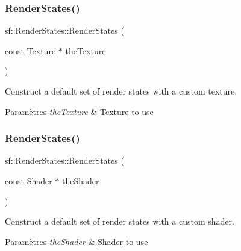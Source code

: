 \subsubsection{\texorpdfstring{Render\+States()}{RenderStates()}\hspace{0.1cm}{\footnotesize\ttfamily [4/6]}}
{\footnotesize\ttfamily sf\+::\+Render\+States\+::\+Render\+States (\begin{DoxyParamCaption}\item[{const \hyperlink{classsf_1_1Texture}{Texture} $\ast$}]{the\+Texture }\end{DoxyParamCaption})}



Construct a default set of render states with a custom texture. 


\begin{DoxyParams}{Paramètres}
{\em the\+Texture} & \hyperlink{classsf_1_1Texture}{Texture} to use \\
\hline
\end{DoxyParams}
\mbox{\label{classsf_1_1RenderStates_a39f94233f464739d8d8522f3aefe97d0}} 
\subsubsection{\texorpdfstring{Render\+States()}{RenderStates()}\hspace{0.1cm}{\footnotesize\ttfamily [5/6]}}
{\footnotesize\ttfamily sf\+::\+Render\+States\+::\+Render\+States (\begin{DoxyParamCaption}\item[{const \hyperlink{classsf_1_1Shader}{Shader} $\ast$}]{the\+Shader }\end{DoxyParamCaption})}



Construct a default set of render states with a custom shader. 


\begin{DoxyParams}{Paramètres}
{\em the\+Shader} & \hyperlink{classsf_1_1Shader}{Shader} to use \\
\hline
\end{DoxyParams}
\mbox{\label{classsf_1_1RenderStates_ab5eda13cd8c79c74eba3b1b0df817d67}} 

